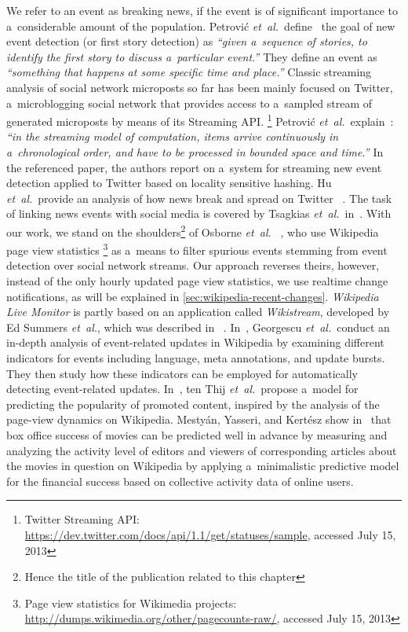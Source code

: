 We refer to an event as breaking news, if the event is of significant importance
to a~considerable amount of the population.
Petrovi\'{c} \emph{et~al.}\ define~\cite{petrovic2010streamingfirststory}
the goal of new event detection (or first story detection) as
\textit{``given a~sequence of stories, to identify the first story
to discuss a~particular event.''}
They define an event as \textit{``something that happens
at some specific time and place.''}
Classic streaming analysis of social network microposts so far has been mainly
focused on Twitter, a~microblogging social network that provides access
to a~sampled stream of generated microposts by means of its Streaming API.%
\footnote{Twitter Streaming API:
\url{https://dev.twitter.com/docs/api/1.1/get/statuses/sample},
accessed July 15, 2013}
Petrovi\'{c} \emph{et~al.}\ explain~\cite{petrovic2010streamingfirststory}:
\textit{``in the streaming model of computation,
items arrive continuously in a~chronological order, and have to be
processed in bounded space and time.''}
In the referenced paper, the authors report on a~system for streaming
new event detection applied to Twitter based on locality sensitive hashing.
Hu \emph{et~al.}\ provide an analysis of how news break and spread on Twitter~%
\cite{hu2012breakingnews}.
The task of linking news events with social media is covered by Tsagkias
\emph{et~al.}\ in~\cite{tsagkias2011linkingonlinenews}.
With our work, we stand on the shoulders\footnote{Hence the title of the publication related to this chapter}
of Osborne \emph{et~al.}\ %
\cite{osborne2012bieber}, who use Wikipedia page view statistics%
\footnote{Page view statistics for Wikimedia projects:
\url{http://dumps.wikimedia.org/other/pagecounts-raw/},
accessed July 15, 2013}
as a~means to filter spurious events
stemming from event detection over social network streams.
Our approach reverses theirs, however, instead of the only hourly updated
page view statistics, we use realtime change notifications,
as will be explained in \autoref{sec:wikipedia-recent-changes}.
\emph{Wikipedia Live Monitor} is partly based on an application called
\emph{Wikistream}, developed by Ed Summers \emph{et~al.}, which was described in~%
\cite{summers2011odetonode}.
In~\cite{georgescu2013extractingwikipedia}, Georgescu
\emph{et~al.}\ conduct an in-depth analysis of
event-related updates in Wikipedia by examining
different indicators for events including language,
meta annotations, and update bursts.
They then study how these indicators can be employed
for automatically detecting event-related updates.
In~\cite{tenthij2012modelingwikipedia}, ten Thij
\emph{et~al.}\ propose a~model for predicting the popularity
of promoted content, inspired by the analysis of
the page-view dynamics on Wikipedia. 
Mestyán, Yasseri, and Kertész show
in~\cite{mestyan2012boxoffice} that box office success of
movies can be predicted well in advance by measuring
and analyzing the activity level of editors and viewers
of corresponding articles about the movies in question on Wikipedia
by applying a~minimalistic predictive model
for the financial success based on
collective activity data of online users.


